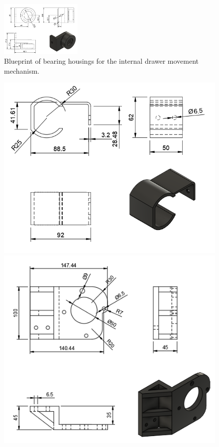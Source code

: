 \begin{figure}[H]
    \centering
    \includegraphics[width=0.35\textwidth]{PLANOS/PLANO_CHUMACERA.png}
    \caption{Blueprint of bearing housings for the internal drawer movement mechanism.}
    \label{fig:chumacera}
\end{figure}


\begin{figure}[H]
    \centering
    \begin{minipage}{0.45\textwidth}
        \centering
        \includegraphics[width=\textwidth]{PLANOS/PLANO_SOPORTE_MOTOR_1.png}
        \caption{}
        \label{fig:soporte_motor}
    \end{minipage}%
    \hfill
    \begin{minipage}{0.45\textwidth}
        \centering
        \includegraphics[width=\textwidth]{PLANOS/PLANO_SOPORTE_MOTOR_2.png}

\end{minipage}
\end{figure}
